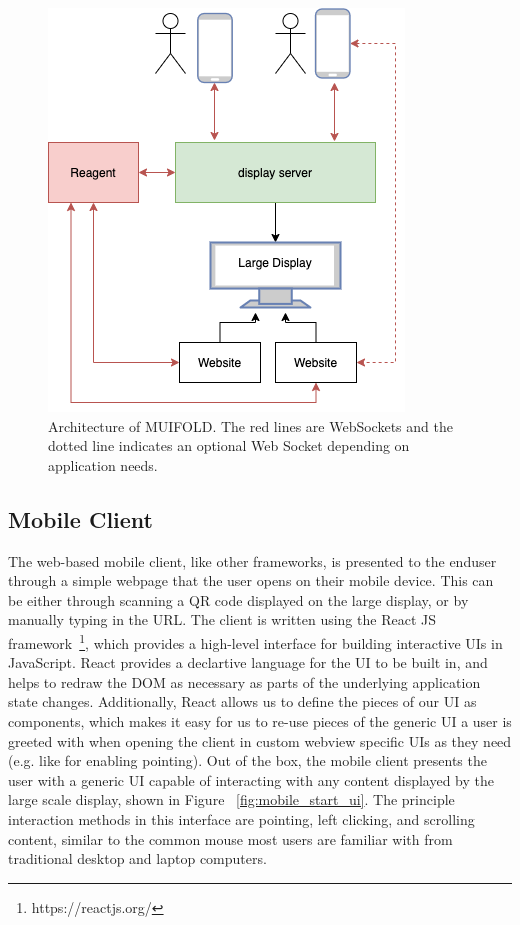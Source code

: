 \begin{figure}
\centering
  \includegraphics[width=0.8\columnwidth]{chapters/04_muifold/figures/muifold_architecture}
  \caption{Architecture of MUIFOLD. The red lines are WebSockets and the dotted line indicates an optional Web Socket depending on application needs.}
  \label{fig:architecture_muifold}
\end{figure}

\subsection{Mobile Client}

The web-based mobile client, like other frameworks, is presented to the enduser through a simple webpage that the user opens on their
mobile device. This
can be either through scanning a QR code displayed on the large
display, or by manually typing in the URL. The client is
written using the React JS
framework~\footnote{https://reactjs.org/}, which provides a
high-level interface for building interactive UIs in JavaScript.
React provides a declartive language for the UI to be built in,
and helps to redraw the DOM as necessary as parts of the underlying
application state changes. Additionally, React allows us to define
the pieces of our UI as components, which makes it easy for us to
re-use pieces of the generic UI a user is greeted with when opening
the client in custom webview specific UIs as they need (e.g. like
for enabling pointing).
Out of the box, the mobile client presents the user with a generic
UI capable of interacting with any content displayed by the
large scale display, shown in Figure ~\ref{fig:mobile_start_ui}. The principle interaction methods in this
interface are pointing, left clicking, and scrolling content, similar
to the common mouse most users are familiar with from traditional
desktop and laptop computers.

